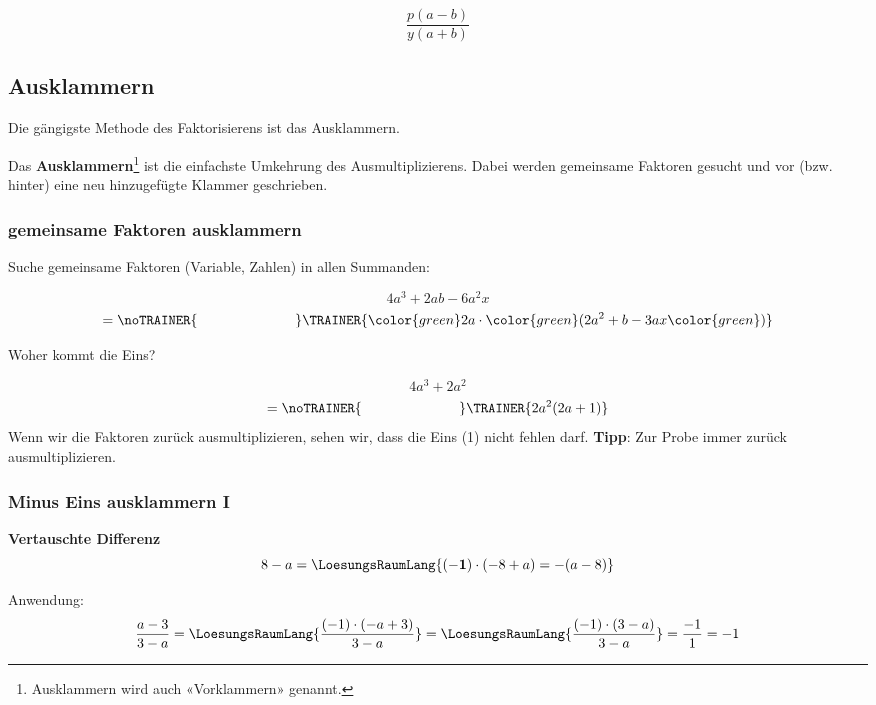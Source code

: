 $$\frac{p(a-b)}{y(a+b)}$$

\newpage

\subsection{Ausklammern}
Die gängigste Methode des Faktorisierens ist das Ausklammern.

Das \textbf{Ausklammern}\footnote{Ausklammern wird auch «Vorklammern» genannt.} ist die einfachste Umkehrung des Ausmultiplizierens.
Dabei werden gemeinsame Faktoren gesucht und vor (bzw. hinter) eine
neu hinzugefügte Klammer geschrieben.

\subsubsection{gemeinsame Faktoren ausklammern}
Suche gemeinsame Faktoren (Variable, Zahlen) in allen Summanden:

\begin{beispiel}{}{}
  $$4a^3 + 2ab -6a^2x$$
  $$=\noTRAINER{\hspace{7em}}\TRAINER{ {\color{green}2a}\cdot{\color{green}(}2a^2+b -3ax{\color{green})}}$$
\end{beispiel}

\begin{beispiel}{Woher kommt die Eins?}{}

$$4a^3 + 2a^2$$
$$=\noTRAINER{\hspace{7em}}\TRAINER{2a^2(2a + 1)}$$
Wenn wir die Faktoren zurück ausmultiplizieren, sehen wir, dass die
Eins (1) nicht fehlen darf. \textbf{Tipp}: Zur Probe immer zurück ausmultiplizieren.
\end{beispiel}

\newpage


\subsubsection{Minus Eins ausklammern I}

\textbf{Vertauschte Differenz}\\

$$8-a = \LoesungsRaumLang{\mathbf{(-1)\cdot{}} (-8 + a) = -(a-8)}$$

Anwendung:
$$\frac{a-3}{3-a} = \LoesungsRaumLang{\frac{(-1)\cdot{}(-a+3)}{3-a}} = \LoesungsRaumLang{\frac{(-1)\cdot{}(3-a)}{3-a}} = \frac{-1}1 = -1$$

